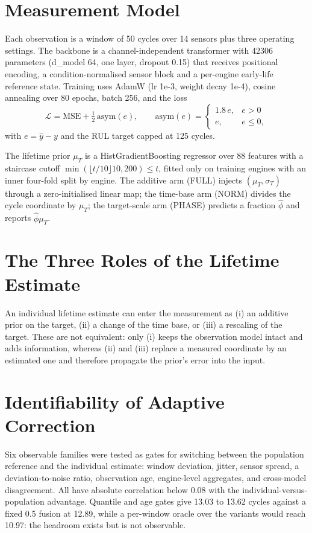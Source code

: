 \documentclass[journal]{IEEEtran}
\begin{document}
\section{Measurement Model}\label{sec:model}
Each observation is a window of 50 cycles over 14 sensors plus three operating settings. The backbone is a channel-independent transformer with 42306 parameters (d_model 64, one layer, dropout 0.15) that receives positional encoding, a condition-normalised sensor block and a per-engine early-life reference state. Training uses AdamW (lr 1e-3, weight decay 1e-4), cosine annealing over 80 epochs, batch 256, and the loss
\begin{equation}
\mathcal{L}=\mathrm{MSE}+\tfrac{1}{2}\,\mathrm{asym}(e),\qquad
\mathrm{asym}(e)=\begin{cases}1.8\,e, & e>0\\ e, & e\le 0,\end{cases}
\end{equation}
with $e=\hat{y}-y$ and the RUL target capped at 125 cycles.

The lifetime prior $\mu_T$ is a HistGradientBoosting regressor over 88 features with a staircase cutoff $\min(\lfloor t/10\rfloor 10,200)\le t$, fitted only on training engines with an inner four-fold split by engine. The additive arm (FULL) injects $(\mu_T,\sigma_T)$ through a zero-initialised linear map; the time-base arm (NORM) divides the cycle coordinate by $\mu_T$; the target-scale arm (PHASE) predicts a fraction $\hat\phi$ and reports $\hat\phi\mu_T$.

\section{The Three Roles of the Lifetime Estimate}\label{sec:roles}
An individual lifetime estimate can enter the measurement as (i) an additive prior on the target, (ii) a change of the time base, or (iii) a rescaling of the target. These are not equivalent: only (i) keeps the observation model intact and adds information, whereas (ii) and (iii) replace a measured coordinate by an estimated one and therefore propagate the prior's error into the input.

\section{Identifiability of Adaptive Correction}\label{sec:ident}
Six observable families were tested as gates for switching between the population reference and the individual estimate: window deviation, jitter, sensor spread, a deviation-to-noise ratio, observation age, engine-level aggregates, and cross-model disagreement. All have absolute correlation below 0.08 with the individual-versus-population advantage. Quantile and age gates give 13.03 to 13.62 cycles against a fixed 0.5 fusion at 12.89, while a per-window oracle over the variants would reach 10.97: the headroom exists but is not observable.
\end{document}
